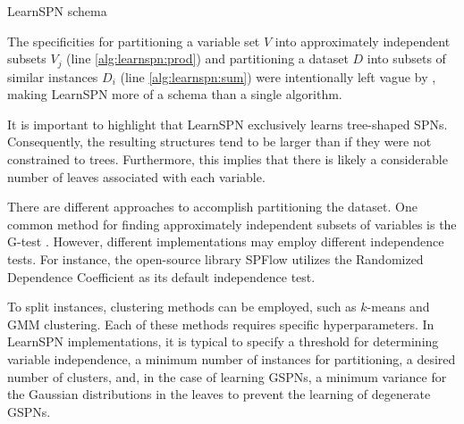\begin{algorithm}[h]
  \caption{LearnSPN schema}
  \label{alg:learnspn}
  \begin{algorithmic}
  \end{algorithmic}
  \begin{algorithmic}[1]
    \State {}
    \Else
     \label{alg:learnspn:prod}
    \State {}
    \Else
     \label{alg:learnspn:sum}
    \State {}
    \EndIf
    \EndIf
  \end{algorithmic}
\end{algorithm}

The specificities for partitioning a variable set $V$ into approximately independent subsets $V_j$ (line \ref{alg:learnspn:prod}) and partitioning a dataset $D$ into subsets of similar instances $D_i$ (line \ref{alg:learnspn:sum}) were intentionally left vague by \citet{Gens2013}, making LearnSPN more of a schema than a single algorithm.

It is important to highlight that LearnSPN exclusively learns tree-shaped SPNs. Consequently, the resulting structures tend to be larger than if they were not constrained to trees. Furthermore, this implies that there is likely a considerable number of leaves associated with each variable.

There are different approaches to accomplish partitioning the dataset. One common method for finding approximately independent subsets of variables is the G-test \citep{Gens2013}. However, different implementations may employ different independence tests. For instance, the open-source library SPFlow \citep{Molina2019SPFlow} utilizes the Randomized Dependence Coefficient \citep{Lopes-Paz2013} as its default independence test.

To split instances, clustering methods can be employed, such as $k$-means \citep{MacQueen1967} and GMM clustering. Each of these methods requires specific hyperparameters. In LearnSPN implementations, it is typical to specify a threshold for determining variable independence, a minimum number of instances for partitioning, a desired number of clusters, and, in the case of learning GSPNs, a minimum variance for the Gaussian distributions in the leaves to prevent the learning of degenerate GSPNs.


